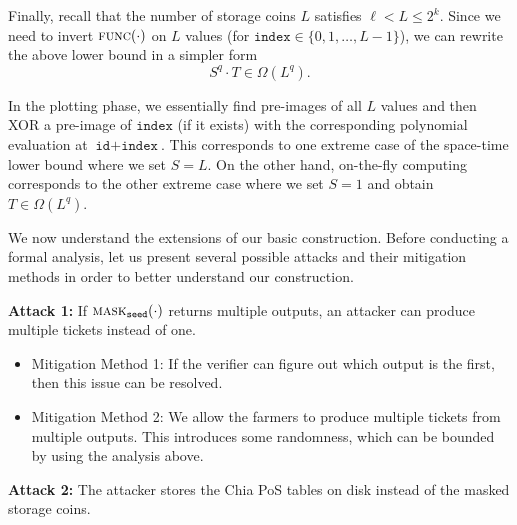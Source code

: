 \documentclass[12pt, onecolumn]{IEEEtran}
\newcommand{\id}{\texttt{id}}
\newcommand{\seed}{\texttt{seed}}
\newcommand{\ind}{\texttt{index}}
\newcommand{\mask}{\textsc{mask}}
\newcommand{\func}{\textsc{func}}
\begin{document}

Finally, recall that the number of storage coins $L$ satisfies $\ell < L \le 2^k$. Since we need to invert $\func(\cdot)$ on $L$ values (for $\ind \in \{0, 1, \ldots, L - 1 \}$), we can rewrite the above lower bound in a simpler form 
\begin{equation}\label{eq:general_bound}
    S^q \cdot T \in \Omega\left(L^q \right).
\end{equation}

In the plotting phase, we essentially find pre-images of all $L$ values  and then XOR a pre-image of $\ind$ (if it exists) with the corresponding polynomial evaluation at $\id + \ind$. 
This corresponds to one extreme case of the space-time lower bound where we set $S = L$.
On the other hand, on-the-fly computing corresponds to the other extreme case where we set $S = 1$ and obtain $T \in \Omega\left(L^q \right)$.


We now understand the extensions of our basic construction. Before conducting a formal analysis, let us present several possible attacks and their mitigation methods in order to better understand our construction.

{\bf Attack 1:} If $\mask_{\seed}(\cdot)$ returns multiple outputs, an attacker can produce multiple tickets instead of one.

\begin{itemize}
    \item Mitigation Method 1: If the verifier can figure out which output is the first, then this issue can be resolved.
    \item Mitigation Method 2: We allow the farmers to produce multiple tickets from multiple outputs. This introduces some randomness, which can be bounded by using the analysis above.
\end{itemize}

{\bf Attack 2:} The attacker stores the Chia PoS tables on disk instead of the masked storage coins.
\end{document}
